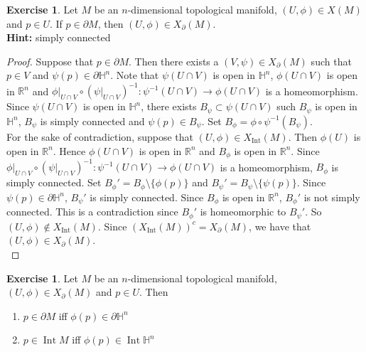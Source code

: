 \documentclass{book}
\theoremstyle{definition}
\newtheorem{ex}[definition]{Exercise}
\renewcommand{\H}{\mathbb{H}}
\newcommand{\R}{\mathbb{R}}
\DeclareMathOperator{\Int}{Int}
\DeclareMathOperator*{\0}{\mbf{0}}
\DeclareMathOperator*{\1}{\mbf{1}}
\newcommand{\p}{\partial}
\begin{document}
	\begin{ex}
		Let $M$ be an $n$-dimensional topological manifold, $(U, \phi) \in X(M)$ and $p \in U$. If $p \in \partial M$, then $(U, \phi) \in X_{\p}(M)$. \\
		\textbf{Hint:} simply connected
	\end{ex}

	\begin{proof}
		Suppose that $p \in \partial M$. Then there exists a $(V, \psi) \in X_{\p}(M)$ such that $p \in V$ and $\psi(p) \in \partial \H^n$. Note that $\psi(U \cap V)$ is open in $\H^n$, $\phi(U \cap V)$ is open in $\R^n$ and $\phi|_{U \cap V} \circ (\psi|_{U \cap V})^{-1}: \psi^{-1}(U \cap V) \rightarrow \phi(U \cap V)$ is a homeomorphism. \\
		Since $\psi(U \cap V)$ is open in $\H^n$, there exists $B_{\psi} \subset \psi(U \cap V)$ such $B_{\psi}$ is open in $\H^n$, $B_{\psi}$ is simply connected and $\psi(p) \in B_{\psi}$. Set $B_{\phi} = \phi \circ \psi^{-1}(B_{\psi})$. \\
		For the sake of contradiction, suppose that $(U, \phi) \in X_{\Int}(M)$. Then $\phi(U)$ is open in $\R^n$. Hence $\phi(U \cap V)$ is open in $\R^n$ and $B_{\phi}$ is open in $\R^n$. Since $\phi|_{U \cap V} \circ (\psi|_{U \cap V})^{-1}: \psi^{-1}(U \cap V) \rightarrow \phi(U \cap V)$ is a homeomorphism, $B_{\phi}$ is simply connected. Set $B_{\phi}' = B_{\phi} \setminus \{\phi(p)\}$ and $B_{\psi}' = B_{\psi} \setminus \{\psi(p)\}$. Since $\psi(p) \in \p \H^n$, $B_{\psi}'$ is simply connected. Since $B_{\phi}$ is open in $\R^n$, $B_{\phi}'$ is not simply connected. This is a contradiction since $B_{\phi}'$ is homeomorphic to $B_{\psi}'$. So $(U, \phi) \not \in X_{\Int}(M)$. Since $(X_{\Int}(M))^c = X_{\p}(M)$, we have that $(U, \phi) \in X_{\p}(M)$.\\
	\end{proof}

	\begin{ex}
		Let $M$ be an $n$-dimensional topological manifold, $(U, \phi) \in X_{\p}(M)$ and $p \in U$. Then 
		\begin{enumerate}
			\item $p \in \p M$ iff $\phi(p) \in \p \H^n$
			\item $p \in \Int M$ iff $\phi(p) \in \Int \H^n$
		\end{enumerate}
	\end{ex}
\end{document}
